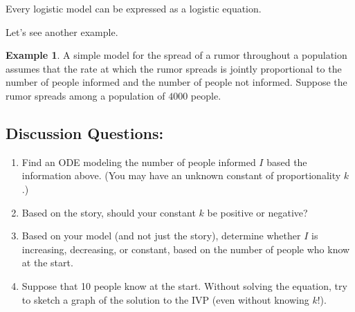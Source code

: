 \documentclass[12pt]{amsart}
\numberwithin{equation}{section}
\theoremstyle{plain} %
\theoremstyle{definition}
\newtheorem{ex}[equation]{Example}
\theoremstyle{remark}
\begin{document}
Every logistic model can be expressed as a logistic equation.

Let's see another example.

\begin{ex} A simple model for the spread of a rumor throughout a population assumes that the rate at which the rumor spreads is jointly proportional to the number of people informed and the number of people not informed. Suppose the rumor spreads among a population of $4000$ people.
\end{ex}

\subsection*{Discussion Questions:}
\begin{enumerate}
\item Find an ODE modeling the number of people informed $I$ based the information above. (You may have an unknown constant of proportionality $k$.)
\item Based on the story, should your constant $k$ be positive or negative?
\item Based on your model (and not just the story), determine whether $I$ is increasing, decreasing, or constant, based on the number of people who know at the start.
\item Suppose that 10 people know at the start. Without solving the equation, try to sketch a graph of the solution to the IVP (even without knowing $k$!).
\end{enumerate}
\end{document}
